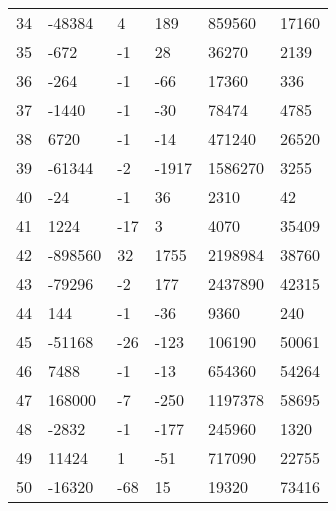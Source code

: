\documentclass{amsart}
\begin{document}
\begin{longtable}{llllll}
34 & -48384 & 4 & 189 & 859560 & 17160\\
35 & -672 & -1 & 28 & 36270 & 2139\\
36 & -264 & -1 & -66 & 17360 & 336\\
37 & -1440 & -1 & -30 & 78474 & 4785\\
38 & 6720 & -1 & -14 & 471240 & 26520\\
39 & -61344 & -2 & -1917 & 1586270 & 3255\\
40 & -24 & -1 & 36 & 2310 & 42\\
41 & 1224 & -17 & 3 & 4070 & 35409\\
42 & -898560 & 32 & 1755 & 2198984 & 38760\\
43 & -79296 & -2 & 177 & 2437890 & 42315\\
44 & 144 & -1 & -36 & 9360 & 240\\
45 & -51168 & -26 & -123 & 106190 & 50061\\
46 & 7488 & -1 & -13 & 654360 & 54264\\
47 & 168000 & -7 & -250 & 1197378 & 58695\\
48 & -2832 & -1 & -177 & 245960 & 1320\\
49 & 11424 & 1 & -51 & 717090 & 22755\\
50 & -16320 & -68 & 15 & 19320 & 73416\\
\hline
\end{longtable}
\end{document}
